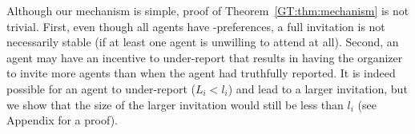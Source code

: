 	Although our mechanism is simple, proof of Theorem~\ref{GT:thm:mechanism} is not trivial. First, even though all agents have \INC-preferences, a full invitation is not necessarily stable (if at least one agent is unwilling to attend at all). Second, an agent may have an incentive to under-report that results in having the organizer to invite more agents than when the agent had truthfully reported. It is indeed possible for an agent to under-report ($L_i < l_i$) and lead to a larger invitation, but we show that the size of the larger invitation would still be less than $l_i$ (see Appendix for a proof). 


%




